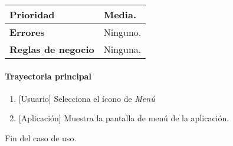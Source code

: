 \begin{longtable}{|J{5cm}|J{10.3cm}|}
		\\ \hline 
	\textbf{Prioridad} & 
		Media. \\ \hline
	\textbf{Errores} & Ninguno.
		\\ \hline
	\textbf{Reglas de negocio} & Ninguna.
		 \\ \hline
\end{longtable}

\paragraph{Trayectoria principal}
	\begin{enumerate}
		\item {[Usuario]} Selecciona el ícono de \textit{Menú} %
		\item {[Aplicación]} Muestra la pantalla de menú de la aplicación. %
	\end{enumerate}
	Fin del caso de uso.

